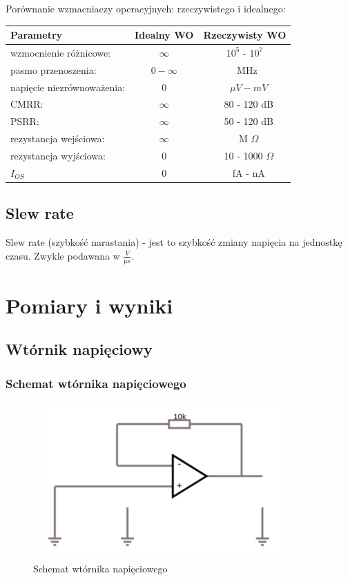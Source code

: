 \documentclass[a4paper,12pt]{article}
\begin{document}
\begin{justify}
Porównanie wzmacniaczy operacyjnych: rzeczywistego i idealnego:
\begin{center}
\begin{tabular}{ |l|c|c| }
\hline
Parametry & Idealny WO & Rzeczywisty WO \\
\hline
wzmocnienie  różnicowe:  & $\infty$ & $10^5$ \; - \; $10^7$ \\
pasmo  przenoszenia: & $0 - \infty$ & ~MHz \\
napięcie niezrównoważenia: & 0 & ~ $\mu V - mV$ \\
CMRR: & $\infty$ & ~ 80 - 120 dB \\
PSRR: & $\infty$ & ~ 50 - 120 dB \\
rezystancja wejściowa: & $\infty$ & ~ M $\Omega$ \\
rezystancja wyjściowa: & 0 & ~ 10 - 1000 $\Omega$ \\
$I_{OS}$ & 0 & ~ fA - nA \\
\hline
\end{tabular}
\end{center}

\subsection{Slew rate \label{sr}}

Slew rate (szybkość narastania) - jest to szybkość zmiany napięcia na jednostkę czasu. Zwykle podawana w $\frac{V}{\si{\micro s}}$.

\newpage

\section{Pomiary i wyniki}

\subsection{Wtórnik napięciowy}

\subsubsection{Schemat wtórnika napięciowego}

\begin{figure}[h]
\centering
\includegraphics[width=10cm, height=6cm]{wn}
\caption{Schemat wtórnika napięciowego}
\end{figure}


\end{justify}
\end{document}
